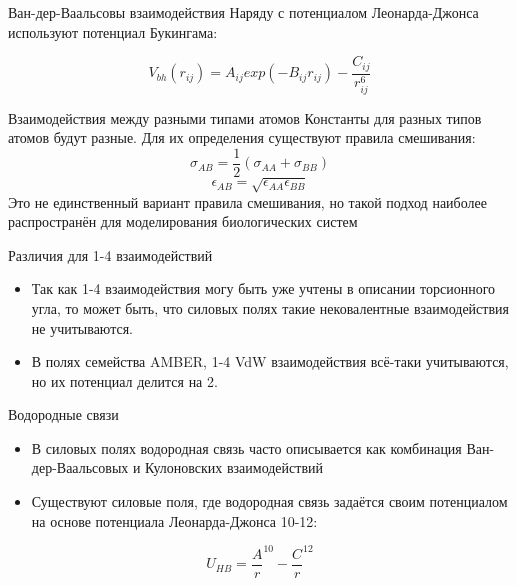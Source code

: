 \begin{frame}{Ван-дер-Ваальсовы взаимодействия}
Наряду с потенциалом Леонарда-Джонса используют потенциал Букингама:

\[ V_{bh}(r_{ij})= A_{ij}exp(-B_{ij}r_{ij})-\frac{C_{ij}}{r^6_{ij}} \]
\end{frame}

\begin{frame}{Взаимодействия между разными типами атомов}
Константы для разных типов атомов будут разные. Для их определения существуют правила смешивания:\\
\[\sigma_{AB}= \frac{1}{2}\left( \sigma_{AA} + \sigma_{BB}\right ) \]
\[\epsilon_{AB}= \sqrt{ \epsilon_{AA} \epsilon_{BB}} \]
Это не единственный вариант правила смешивания, но такой подход наиболее распространён для моделирования биологических систем 
\end{frame}


\begin{frame}{Различия для 1-4 взаимодействий}{}
 \begin{itemize}
  \item
Так как 1-4 взаимодействия могу быть уже учтены в описании торсионного угла, то может быть, что силовых полях такие нековалентные взаимодействия не учитываются.
\vspace{0.2cm}
  \item
В полях семейства AMBER, 1-4 VdW взаимодействия всё-таки учитываются, но их потенциал делится на 2.
  \end{itemize}
\end{frame}


\begin{frame}{Водородные связи}{}
 \begin{itemize}
  \item
В силовых  полях водородная связь часто описывается как комбинация Ван-дер-Ваальсовых и Кулоновских взаимодействий
\vspace{0.2cm}
  \item
Существуют силовые поля, где водородная связь задаётся своим потенциалом на основе потенциала Леонарда-Джонса 10-12:
  \end{itemize}
  \[ U_{HB}=\frac{A}{r}^{10} -\frac{C}{r}^{12} \]
\end{frame}

